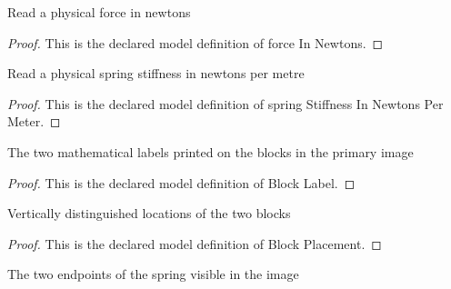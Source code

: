 \begin{definition}
  \label{def:physics:phyx-mini-0258:phyxminiproblems-problemphyxmini0258-forceinnewtons}
  Read a physical force in newtons
\end{definition}
\begin{proof}
  This is the declared model definition of force In Newtons.
\end{proof}
\begin{definition}
  \label{def:physics:phyx-mini-0258:phyxminiproblems-problemphyxmini0258-springstiffnessinnewtonspermeter}
  Read a physical spring stiffness in newtons per metre
\end{definition}
\begin{proof}
  This is the declared model definition of spring Stiffness In Newtons Per Meter.
\end{proof}
\begin{definition}
  \label{def:physics:phyx-mini-0258:phyxminiproblems-problemphyxmini0258-blocklabel}
  The two mathematical labels printed on the blocks in the primary image
\end{definition}
\begin{proof}
  This is the declared model definition of Block Label.
\end{proof}
\begin{definition}
  \label{def:physics:phyx-mini-0258:phyxminiproblems-problemphyxmini0258-blockplacement}
  Vertically distinguished locations of the two blocks
\end{definition}
\begin{proof}
  This is the declared model definition of Block Placement.
\end{proof}
\begin{definition}
  \label{def:physics:phyx-mini-0258:phyxminiproblems-problemphyxmini0258-springendpoint}
  The two endpoints of the spring visible in the image
\end{definition}
